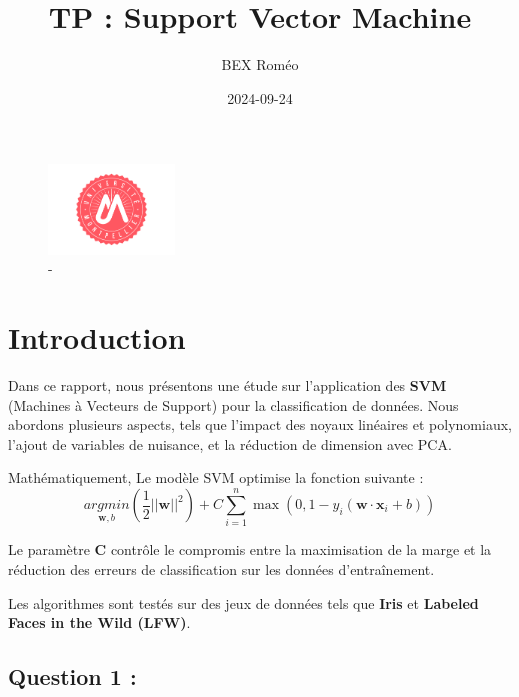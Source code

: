 \documentclass[
  letterpaper,
  DIV=11,
  numbers=noendperiod]{scrartcl}
\title{TP : Support Vector Machine}
\author{BEX Roméo}
\date{2024-09-24}
\begin{document}
\maketitle
\ifdefined\Shaded\renewenvironment{Shaded}{\begin{tcolorbox}[breakable, frame hidden, borderline west={3pt}{0pt}{shadecolor}, interior hidden, boxrule=0pt, enhanced, sharp corners]}{\end{tcolorbox}}\fi

\begin{figure}

{\centering \includegraphics[width=0.3\textwidth,height=\textheight]{tp_files/mediabag/logo_um.pdf}

}

\caption{-}

\end{figure}

\hypertarget{introduction}{%
\section{Introduction}\label{introduction}}

Dans ce rapport, nous présentons une étude sur l'application des
\textbf{SVM} (Machines à Vecteurs de Support) pour la classification de
données. Nous abordons plusieurs aspects, tels que l'impact des noyaux
linéaires et polynomiaux, l'ajout de variables de nuisance, et la
réduction de dimension avec PCA.

Mathématiquement, Le modèle SVM optimise la fonction suivante : \[ 
\underset{\mathbf{w},b}{argmin} \left( \frac{1}{2} ||\mathbf{w}||^2 \right) + C \sum_{i=1}^{n} \max(0, 1 - y_i(\mathbf{w} \cdot \mathbf{x}_i + b))
\]

Le paramètre \textbf{C} contrôle le compromis entre la maximisation de
la marge et la réduction des erreurs de classification sur les données
d'entraînement.

Les algorithmes sont testés sur des jeux de données tels que
\textbf{Iris} et \textbf{Labeled Faces in the Wild (LFW)}.

\hypertarget{question-1}{%
\subsection{Question 1 :}\label{question-1}}
\end{document}
